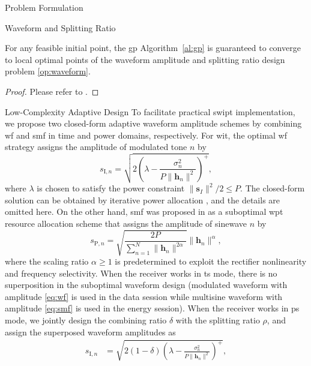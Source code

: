 \begin{section}{Problem Formulation}
\begin{subsection}{Waveform and Splitting Ratio}
		\begin{proposition}\label{pr:gp}
			For any feasible initial point, the \gls{gp} Algorithm~\ref{al:gp} is guaranteed to converge to local optimal points of the waveform amplitude and splitting ratio design problem \eqref{op:waveform}.
		\end{proposition}

		\begin{proof}\label{pf:gp}
			Please refer to \cite{Clerckx2016a,Clerckx2018b}.
		\end{proof}
	\end{subsection}


	\begin{subsection}{Low-Complexity Adaptive Design}
		To facilitate practical \gls{swipt} implementation, we propose two closed-form adaptive waveform amplitude schemes by combining \gls{wf} and \gls{smf} in time and power domains, respectively. For \gls{wit}, the optimal \gls{wf} strategy assigns the amplitude of modulated tone $n$ by
		\begin{equation}\label{eq:wf}
			s_{\mathrm{I}, n} = \sqrt{2\left(\lambda - \frac{\sigma_n^2}{P \lVert{\boldsymbol{h}_n}\rVert^2}\right)^+},
		\end{equation}
		where $\lambda$ is chosen to satisfy the power constraint $\lVert{\boldsymbol{s}_I}\rVert^2 / 2 \le P$. The closed-form solution can be obtained by iterative power allocation \cite{Tse2005}, and the details are omitted here. On the other hand, \gls{smf} was proposed in \cite{Clerckx2017} as a suboptimal \gls{wpt} resource allocation scheme that assigns the amplitude of sinewave $n$ by
		\begin{equation}\label{eq:smf}
			s_{\mathrm{P}, n} = \sqrt{\frac{2 P}{\sum_{n=1}^N \lVert{\boldsymbol{h}_n \rVert^{2 \alpha}}}}\lVert{\boldsymbol{h}_n}\rVert^\alpha,
		\end{equation}
		where the scaling ratio $\alpha \ge 1$ is predetermined to exploit the rectifier nonlinearity and frequency selectivity. When the receiver works in \gls{ts} mode, there is no superposition in the suboptimal waveform design (modulated waveform with amplitude \eqref{eq:wf} is used in the data session while multisine waveform with amplitude \eqref{eq:smf} is used in the energy session). When the receiver works in \gls{ps} mode, we jointly design the combining ratio $\delta$ with the splitting ratio $\rho$, and assign the superposed waveform amplitudes as
		\begin{align}
			s_{\mathrm{I}, n} &= \sqrt{2(1 - \delta)\left(\lambda - \frac{\sigma_n^2}{P \lVert{\boldsymbol{h}_n}\rVert^2}\right)^+}, \label{eq:s_i}\\

\end{align}
\end{subsection}
\end{section}
